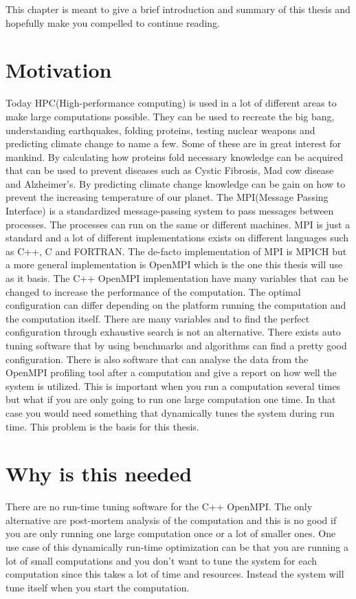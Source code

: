 \documentclass[thesis.tex]{subfiles}
\begin{document}
This chapter is meant to give a brief introduction and summary of this thesis and hopefully make you compelled to continue reading.
\section{Motivation}
Today HPC(High-performance computing) is used in a lot of different areas to make large computations possible. They can be used to recreate the big bang, understanding earthquakes, folding proteins, testing nuclear weapons and predicting climate change to name a few. Some of these are in great interest for mankind. By calculating how proteins fold necessary knowledge can be acquired that can be used to prevent diseases such as Cystic Fibrosis, Mad cow disease and Alzheimer's. By predicting climate change knowledge can be gain on how to prevent the increasing temperature of our planet. 
\newline
\newline
The MPI(Message Passing Interface) is a standardized message-passing system to pass messages between processes. The processes can run on the same or different machines. MPI is just a standard and a lot of different implementations exists on different languages such as C++, C and FORTRAN. The de-facto implementation of MPI is MPICH but a more general implementation is OpenMPI which is the one this thesis will use as it basis.
\newline
\newline
The C++ OpenMPI implementation have many variables that can be changed to increase the performance of the computation. The optimal configuration can differ depending on the platform running the computation and the computation itself. There are many variables and to find the perfect configuration through exhaustive search is not an alternative. There exists auto tuning software that by using benchmarks and algorithms can find a pretty good configuration. There is also software that can analyse the data from the OpenMPI profiling tool after a computation and give a report on how well the system is utilized. This is important when you run a computation several times but what if you are only going to run one large computation one time. In that case you would need something that dynamically tunes the system during run time. This problem is the basis for this thesis.
\section{Why is this needed}
There are no run-time tuning software for the C++ OpenMPI. The only alternative are post-mortem analysis of the computation and this is no good if you are only running one large computation once or a lot of smaller ones. One use case of this dynamically run-time optimization can be that you are running a lot of small computations and you don't want to tune the system for each computation since this takes a lot of time and resources. Instead the system will tune itself when you start the computation.
\end{document}
